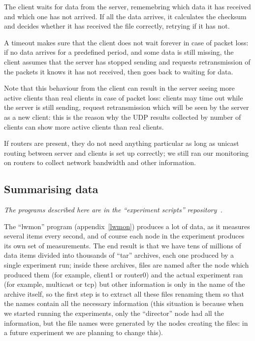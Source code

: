 \documentclass[a4paper,11pt,twocolumn]{article}
\begin{document}
The client waits for data from the server, rememebring which
data it has received and which one has not arrived.  If all
the data arrives, it calculates the checksum and decides
whether it has received the file correctly, retrying if it has
not.

A timeout makes sure that the client does not wait forever in case of
packet loss: if no data arrives for a predefined period, and some
data is still missing, the client assumes that the server has stopped
sending and requests retransmission of the packets it knows it has
not received, then goes back to waiting for data.

Note that this behaviour from the client can result in the server
seeing more active clients than real clients in case of packet loss:
clients may time out while the server is still sending, request
retransmission which will be seen by the server as a new client:
this is the reason why the UDP results collected by number of
clients can show more active clients than real clients.

If routers are present, they do not need anything particular as long
as unicast routing between server and clients is set up correctly;
we still ran our monitoring on routers to collect network bandwidth
and other information.

\subsection{Summarising data}
\label{summaries}

{\em The programs described here are in the ``experiment scripts''
repository~\cite{exp:scripts}.}

The ``lwmon'' program (appendix~\ref{lwmon}) produces a lot of data, as it
measures several items every second, and of course each node in the
experiment produces its own set of measurements.  The end result is that
we have tens of millions of data items divided into thousands of ``tar''
archives, each one produced by a single experiment run; inside these
archives, files are named after the node which produced them (for example,
client1 or router0) and the actual experiment ran (for example, multicast
or tcp) but other information is only in the name of the archive itself,
so the first step is to extract all these files renaming them so that
the names contain all the necessary information (this situation is because
when we started running the experiments, only the ``director'' node
had all the information, but the file names were generated by the nodes
creating the files: in a future experiment we are planning to change this).
\end{document}
